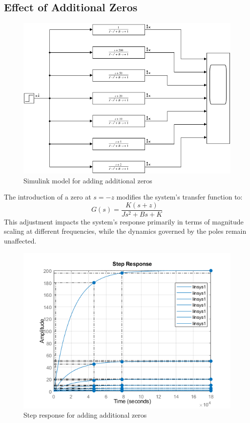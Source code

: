 \documentclass[a4paper, 12pt, english]{article}
\begin{document}
\subsection{Effect of Additional Zeros} \label{sec:effect of additional zeros}
\begin{figure}[H]
    \centering
    \includegraphics[width=\linewidth]{report/images/zeros_step_response_model.png}
    \caption{Simulink model for adding additional zeros}
    \label{fig:Simulink additional zeros}
\end{figure}
The introduction of a zero at $ {s} = {-z} $ modifies the system's transfer function to:
\[ {G\left({s}\right)} = \frac{{K}{\left( s + z \right)}}{{J}{{s}^{2}} + {B}{s} + {K}} \]
This adjustment impacts the system's response primarily in terms of magnitude scaling at different frequencies, while the dynamics governed by the poles remain unaffected.

\begin{figure}[H]
    \centering
    \includegraphics[width=0.82\linewidth]{report/images/zeros_step_response.png}
    \caption{Step response for adding additional zeros}
    \label{fig:Step response for additional zeros}
\end{figure}
\end{document}
